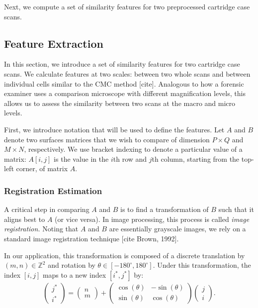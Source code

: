 \documentclass[
]{jdssv}
\begin{document}
Next, we compute a set of similarity features for two preprocessed
cartridge case scans.

\hypertarget{feature-extraction}{%
\subsection{Feature Extraction}\label{feature-extraction}}

In this section, we introduce a set of similarity features for two
cartridge case scans. We calculate features at two scales: between two
whole scans and between individual cells similar to the CMC method
{[}cite{]}. Analogous to how a forensic examiner uses a comparison
microscope with different magnification levels, this allows us to assess
the similarity between two scans at the macro and micro levels.

First, we introduce notation that will be used to define the features.
Let \(A\) and \(B\) denote two surfaces matrices that we wish to compare
of dimension \(P \times Q\) and \(M \times N\), respectively. We use
bracket indexing to denote a particular value of a matrix: \(A[i,j]\) is
the value in the \(i\)th row and \(j\)th column, starting from the
top-left corner, of matrix \(A\).

\hypertarget{registration-estimation}{%
\subsubsection{Registration Estimation}\label{registration-estimation}}

A critical step in comparing \(A\) and \(B\) is to find a transformation
of \(B\) such that it aligns best to \(A\) (or vice versa). In image
processing, this process is called \emph{image registration.} Noting
that \(A\) and \(B\) are essentially grayscale images, we rely on a
standard image registration technique {[}cite Brown, 1992{]}.

In our application, this transformation is composed of a discrete
translation by \((m,n) \in \mathbb{Z}^2\) and rotation by
\(\theta \in [-180^\circ,180^\circ]\). Under this transformation, the
index \([i,j]\) maps to a new index \([i^*,j^*]\) by: \begin{align*}
\begin{pmatrix} j^* \\ i^* \end{pmatrix} =
\begin{pmatrix} n \\ m \end{pmatrix} +
\begin{pmatrix} \cos(\theta) & -\sin(\theta) \\ \sin(\theta) & \cos(\theta) \end{pmatrix} \begin{pmatrix} j \\ i \end{pmatrix}.
\end{align*}
\end{document}
